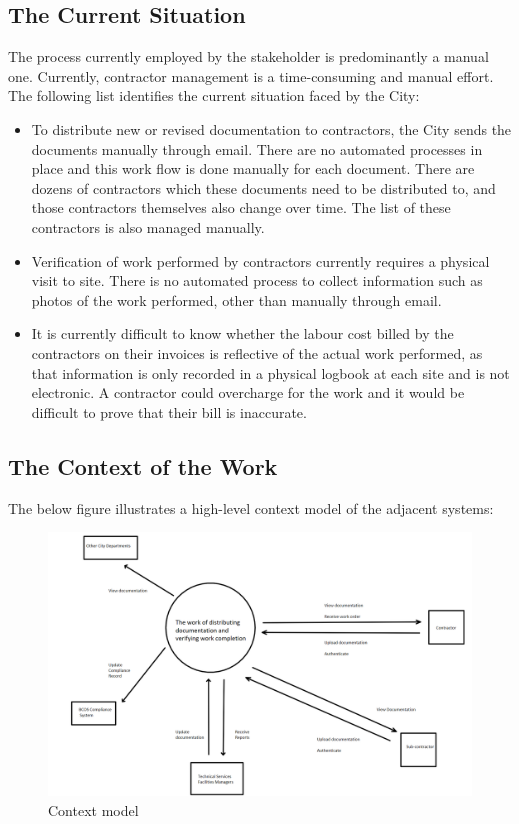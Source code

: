 \documentclass[12pt]{article}
\begin{document}
\subsection{The Current Situation}
The process currently employed by the stakeholder is predominantly a manual one.
Currently, contractor management is a time-consuming and manual effort. The
following list identifies the current situation faced by the City:
\begin{itemize}
  \item To distribute new or revised documentation to contractors,
    the City sends the documents manually through email. There are no
    automated processes in place and this work flow is done manually
    for each document. There are dozens of contractors which these
    documents need to be distributed to, and those contractors
    themselves also change over time. The list of these contractors
    is also managed manually.
  \item Verification of work performed by contractors currently
    requires a physical visit to site. There is no automated process
    to collect information such as photos of the work performed,
    other than manually through email.
  \item It is currently difficult to know whether the labour cost
    billed by the contractors on their invoices is reflective of the
    actual work performed, as that information is only recorded in a
    physical logbook at each site and is not electronic. A contractor
    could overcharge for the work and it would be difficult to prove
    that their bill is inaccurate.

\end{itemize}

\subsection{The Context of the Work}
The below figure illustrates a high-level context model of the adjacent systems:
\begin{figure}[h]
  \centering
  \includegraphics[width=1\textwidth]{4G06A-context-model.png}
  \caption{Context model}
\end{figure}
\end{document}
